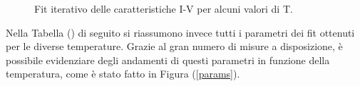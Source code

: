 \documentclass[10pt,letterpaper]{article}
\begin{document}
\begin{figure}
\qquad
{}

\caption{Fit iterativo delle caratteristiche I-V per alcuni valori di T.}
\label{iterative_fit}
\end{figure}


Nella Tabella () di seguito si riassumono invece tutti i parametri dei fit ottenuti per le diverse temperature. Grazie al gran numero di misure a disposizione, è possibile evidenziare degli andamenti di questi parametri in funzione della temperatura, come è stato fatto in Figura (\ref{params}).
\end{document}
